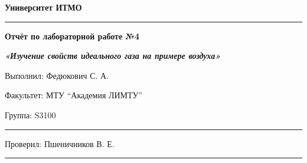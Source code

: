 \documentclass[12pt]{article}
\begin{document}
\pagestyle{empty}
\begin{center}
\large{\textbf{Университет ИТМО}}
\end{center}
\rule{500pt}{1pt}
\par\bigskip\par\bigskip\par\bigskip\par\bigskip\par\bigskip\par\bigskip\par\bigskip\par\bigskip
\begin{center}
\Large
\textbf{Отчёт по лабораторной работе №4}

\textbf{\textit{«Изучение свойств идеального газа на примере воздуха»}}


\end{center}
\par\bigskip\par\bigskip\par\bigskip\par\bigskip\par\bigskip\par\bigskip\par\bigskip\par\bigskip\par\bigskip\par\bigskip\par\bigskip\par\bigskip\par\bigskip\par\bigskip      
\begin{flushright}
\large
Выполнил: Федюкович С. А.
\par\bigskip
Факультет: МТУ “Академия ЛИМТУ”
\par\bigskip
Группа: S3100                       
\par\bigskip\par\bigskip\par\bigskip

\rule{150pt}{0.5pt}
\par\bigskip\par\bigskip\par\bigskip\par\bigskip                                                            
 Проверил: Пшеничников В. Е. 
\par\bigskip \par\bigskip

\rule{150pt}{0.5pt}
\end{flushright}
\end{document}
